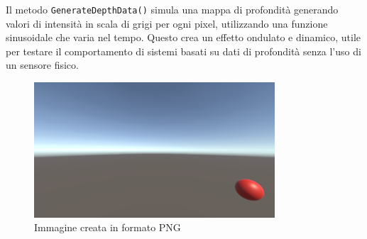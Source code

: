 \documentclass[11pt]{report}
\begin{document}
Il metodo \texttt{GenerateDepthData()} simula una mappa di profondità generando valori di intensità in scala di grigi per ogni pixel, utilizzando una funzione sinusoidale che varia nel tempo. Questo crea un effetto ondulato e dinamico, utile per testare il comportamento di sistemi basati su dati di profondità senza l’uso di un sensore fisico.

\begin{figure}[H]
   \centering
   \includegraphics[width=0.8\textwidth]{images/Immagine4.png}
   \caption{Immagine creata in formato PNG}
   \label{fig:output_image}
\end{figure}
\end{document}
